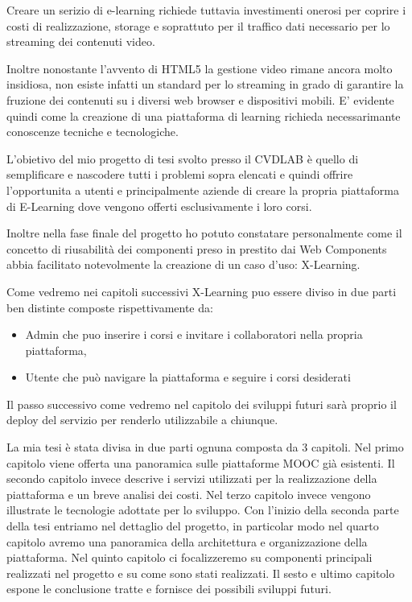 Creare un serizio di e-learning richiede tuttavia investimenti onerosi per coprire i costi di realizzazione, storage e soprattuto per il traffico dati necessario per lo streaming dei contenuti video.

Inoltre nonostante l'avvento di HTML5 la gestione video rimane ancora molto insidiosa, non esiste infatti un standard per lo streaming in grado di garantire la fruzione dei contenuti su i diversi web browser e dispositivi mobili.
E' evidente quindi come la creazione di una piattaforma di learning richieda necessarimante conoscenze tecniche e tecnologiche.


L'obietivo del mio progetto di tesi svolto presso il CVDLAB è quello di semplificare e nascodere tutti i problemi sopra elencati e quindi offrire l'opportunita a utenti e principalmente aziende di creare la propria piattaforma di E-Learning dove vengono offerti esclusivamente i loro corsi.

Inoltre nella fase finale del progetto ho potuto constatare personalmente come il concetto di riusabilità dei componenti preso in prestito dai Web Components abbia facilitato notevolmente la creazione di un caso d'uso: X-Learning.

Come vedremo nei capitoli successivi X-Learning puo essere diviso in due parti ben distinte composte rispettivamente da:
\begin{itemize}
\item Admin che puo inserire i corsi e invitare i collaboratori nella propria piattaforma,
\item Utente che può navigare la piattaforma e seguire i corsi desiderati
\end{itemize}
Il passo successivo come vedremo nel capitolo dei sviluppi futuri sarà proprio il deploy del servizio per renderlo utilizzabile a chiunque.



La mia tesi è stata divisa in due parti ognuna composta da 3 capitoli.
Nel primo capitolo viene offerta una panoramica sulle piattaforme MOOC già esistenti.
Il secondo capitolo invece descrive i servizi utilizzati per la realizzazione della piattaforma e un breve analisi dei costi.
Nel terzo capitolo invece vengono illustrate le tecnologie adottate per lo sviluppo.
Con l'inizio della seconda parte della tesi entriamo nel dettaglio del progetto, in particolar modo nel quarto capitolo avremo una panoramica della architettura e organizzazione della piattaforma.
Nel quinto capitolo ci focalizzeremo su componenti principali realizzati nel progetto e su come sono stati realizzati.
Il sesto e ultimo capitolo espone le conclusione tratte e fornisce dei possibili sviluppi futuri.
